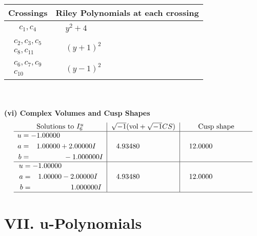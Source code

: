 \documentclass[1p]{elsarticle_modified}
\theoremstyle{definition}
\newcommand{\I}{\sqrt{-1}}
\begin{document}
\begin{tabular}{m{50pt}|m{274pt}}
Crossings & \hspace{64pt}Riley Polynomials at each crossing \\
\hline $$\begin{aligned}c_{1},c_{4}\end{aligned}$$&$\begin{aligned}
&y^2+4
\end{aligned}$\\
\hline $$\begin{aligned}c_{2},c_{3},c_{5}\\c_{8},c_{11}\end{aligned}$$&$\begin{aligned}
&(y+1)^2
\end{aligned}$\\
\hline $$\begin{aligned}c_{6},c_{7},c_{9}\\c_{10}\end{aligned}$$&$\begin{aligned}
&(y-1)^2
\end{aligned}$\\
\hline
\end{tabular}\\~\\
\newpage\flushleft \textbf{(vi) Complex Volumes and Cusp Shapes}
$$\begin{array}{c|c|c}  
\text{Solutions to }I^u_{6}& \I (\text{vol} + \sqrt{-1}CS) & \text{Cusp shape}\\
 \hline 
\begin{aligned}
u &= -1.00000\phantom{ +0.000000I} \\
a &= \phantom{-}1.00000 + 2.00000 I \\
b &= \phantom{-0.000000 } -1.000000 I\end{aligned}
 & \phantom{-}4.93480\phantom{ +0.000000I} & \phantom{-}12.0000\phantom{ +0.000000I} \\ \hline\begin{aligned}
u &= -1.00000\phantom{ +0.000000I} \\
a &= \phantom{-}1.00000 - 2.00000 I \\
b &= \phantom{-0.000000 -}1.000000 I\end{aligned}
 & \phantom{-}4.93480\phantom{ +0.000000I} & \phantom{-}12.0000\phantom{ +0.000000I}\\
 \hline 
 \end{array}$$\newpage
\newpage\renewcommand{\arraystretch}{1}
\centering \section*{ VII. u-Polynomials}
\end{document}
